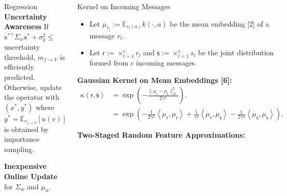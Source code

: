 \documentclass[english]{beamer}
\begin{document}
\begin{frame}
\begin{columns}[t]
\begin{block}{Regression}
\textbf{Uncertainty Awareness}
If $\mathsf{x}^{*\top}\Sigma_{w} \mathsf{x}^{*}+\sigma_{y}^{2} \leq $
uncertainty threshold, $m_{f \rightarrow V}$ is efficiently predicted.
Otherwise, update the operator with $(x^*, y^*)$ where $y^* =\mathbb{E}_{r_{f
\rightarrow V}}[u(v)] $ is obtained by importance sampling.

\vspace{5mm}
\textbf{Inexpensive Online Update} for $\Sigma_w$ and $\mu_w$.
%

\end{block}


\begin{block}{Kernel on Incoming Messages}

\begin{itemize}
    \item Let $\mu_{r_{l}}:=\mathbb{E}_{r_{l}(a)}k(\cdot,a)$ be the mean
        embedding [2] of a message $r_{l}$. 
    \item Let $\mathsf{r}:=\times_{l=1}^c r_{l}$ and
        $\mathsf{s}:=\times_{l=1}^c s_{l}$ be the joint distribution formed
        from $c$ incoming messages.
\end{itemize}
%
\vspace{3mm}

\textbf{Gaussian Kernel on Mean Embeddings [6]: }
\begin{align*}
\kappa(\mathsf{r}, \mathsf{s}) &= 
 \exp\left(-\frac{\|\mu_{\mathsf{r}}-\mu_{\mathsf{s}}\|_{\mathcal{H}}^{2}}{2\gamma^{2}}\right). \\
&= \exp\left(-\frac{1}{2\gamma^{2}}\left\langle
  \mu_{\mathsf{r}},\mu_{\mathsf{r}}\right\rangle
  +\frac{1}{\gamma^{2}}\left\langle
  \mu_{\mathsf{r}},\mu_{\mathsf{s}}\right\rangle
  -\frac{1}{2\gamma^{2}}\left\langle
  \mu_{\mathsf{s}},\mu_{\mathsf{s}}\right\rangle \right).
\end{align*}

\textbf{Two-Staged Random Feature Approximations: }


\end{block}
\end{columns}
\end{frame}
\end{document}
